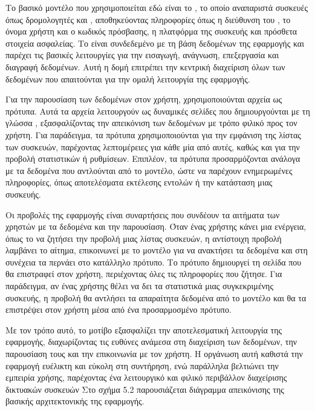Το βασικό μοντέλο που χρησιμοποιείται εδώ είναι το , 
το οποίο αναπαριστά συσκευές όπως δρομολογητές και , 
αποθηκεύοντας πληροφορίες όπως η διεύθυνση του , το όνομα 
χρήστη και ο κωδικός πρόσβασης, η πλατφόρμα της συσκευής 
και πρόσθετα στοιχεία ασφαλείας. Το  είναι συνδεδεμένο με 
τη βάση δεδομένων της εφαρμογής και παρέχει τις βασικές λειτουργίες 
για την εισαγωγή, ανάγνωση, επεξεργασία και διαγραφή δεδομένων. 
Αυτή η δομή επιτρέπει την κεντρική διαχείριση όλων των δεδομένων που 
απαιτούνται για την ομαλή λειτουργία της εφαρμογής.

Για την παρουσίαση των δεδομένων στον χρήστη, χρησιμοποιούνται αρχεία 
 ως πρότυπα. Αυτά τα αρχεία λειτουργούν ως δυναμικές σελίδες 
που δημιουργούνται με τη γλώσσα , εξασφαλίζοντας 
την απεικόνιση των δεδομένων με τρόπο φιλικό προς τον χρήστη. 
Για παράδειγμα, τα πρότυπα χρησιμοποιούνται για την εμφάνιση της λίστας των συσκευών, παρέχοντας λεπτομέρειες για κάθε μία από αυτές, καθώς και για την προβολή στατιστικών ή ρυθμίσεων. Επιπλέον, τα πρότυπα προσαρμόζονται ανάλογα με τα δεδομένα που αντλούνται από το μοντέλο, ώστε να παρέχουν ενημερωμένες πληροφορίες, όπως αποτελέσματα εκτέλεσης εντολών ή την κατάσταση μιας συσκευής.

Οι προβολές της εφαρμογής είναι συναρτήσεις  που συνδέουν 
τα αιτήματα των χρηστών με τα δεδομένα και την παρουσίαση. 
Όταν ένας χρήστης κάνει μια ενέργεια, όπως το να ζητήσει την προβολή 
μιας λίστας συσκευών, η αντίστοιχη προβολή λαμβάνει το αίτημα, 
επικοινωνεί με το μοντέλο για να ανακτήσει τα δεδομένα και στη 
συνέχεια τα περνάει στο κατάλληλο πρότυπο. 
Το πρότυπο δημιουργεί τη σελίδα  που θα επιστραφεί στον χρήστη, περιέχοντας όλες τις πληροφορίες που ζήτησε. Για παράδειγμα, αν ένας χρήστης θέλει να δει τα στατιστικά μιας συγκεκριμένης συσκευής, η προβολή θα αντλήσει τα απαραίτητα δεδομένα από το μοντέλο και θα τα επιστρέψει στον χρήστη μέσα από ένα προσαρμοσμένο πρότυπο.

Με τον τρόπο αυτό, το μοτίβο  εξασφαλίζει την αποτελεσματική 
λειτουργία της εφαρμογής, διαχωρίζοντας τις ευθύνες ανάμεσα στη 
διαχείριση των δεδομένων, την παρουσίαση τους και την επικοινωνία με τον χρήστη. Η οργάνωση αυτή καθιστά την εφαρμογή ευέλικτη και εύκολη στη συντήρηση, ενώ παράλληλα βελτιώνει την εμπειρία χρήσης, παρέχοντας ένα λειτουργικό και φιλικό περιβάλλον διαχείρισης δικτυακών συσκευών
Στο σχήμα 5.2 παρουσιάζεται διάγραμμα απεικόνισης της βασικής αρχιτεκτονικής της εφαρμογής.

